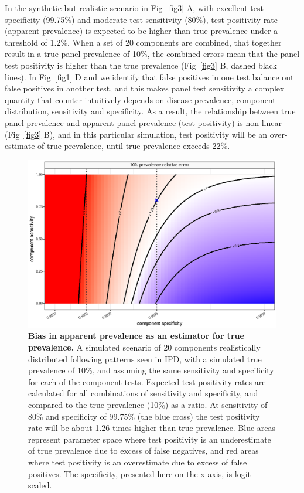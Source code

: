 \documentclass[10pt,letterpaper]{article}
\begin{document}
In the synthetic but realistic scenario in Fig~\ref{fig3} A, with excellent test specificity (99.75\%) and moderate test sensitivity (80\%), test positivity rate (apparent prevalence) is expected to be higher than true prevalence under a threshold of 1.2\%. When a set of 20 components are combined, that together result in a true panel prevalence of 10\%, the combined errors mean that the panel test positivity is higher than the true prevalence (Fig~\ref{fig3} B, dashed black lines). In Fig~\ref{fig1} D and  we identify that false positives in one test balance out false positives in another test, and this makes panel test sensitivity a complex quantity that counter-intuitively depends on disease prevalence, component distribution, sensitivity and specificity. As a result, the relationship between true panel prevalence and apparent panel prevalence (test positivity) is non-linear (Fig~\ref{fig3} B), and in this particular simulation, test positivity will be an over-estimate of true prevalence, until true prevalence exceeds 22\%.

\begin{figure}[ht!]
\centerline{\includegraphics{fig/fig4-impact-error-by-sensitivity-specificity.eps}}
\caption{{\bf Bias in apparent prevalence as an estimator for true prevalence.}
A simulated scenario of 20 components realistically distributed following patterns seen in IPD, with a simulated true prevalence of 10\%, and assuming the same sensitivity and specificity for each of the component tests. Expected test positivity rates are calculated for all combinations of sensitivity and specificity, and compared to the true prevalence (10\%) as a ratio. At sensitivity of 80\% and specificity of 99.75\% (the blue cross) the test positivity rate will be about 1.26 times higher than true prevalence. Blue areas represent parameter space where test positivity is an underestimate of true prevalence due to excess of false negatives, and red areas where test positivity is an overestimate due to excess of false positives. The specificity, presented here on the x-axis, is logit scaled.}
\label{fig4}
\end{figure}
\end{document}
